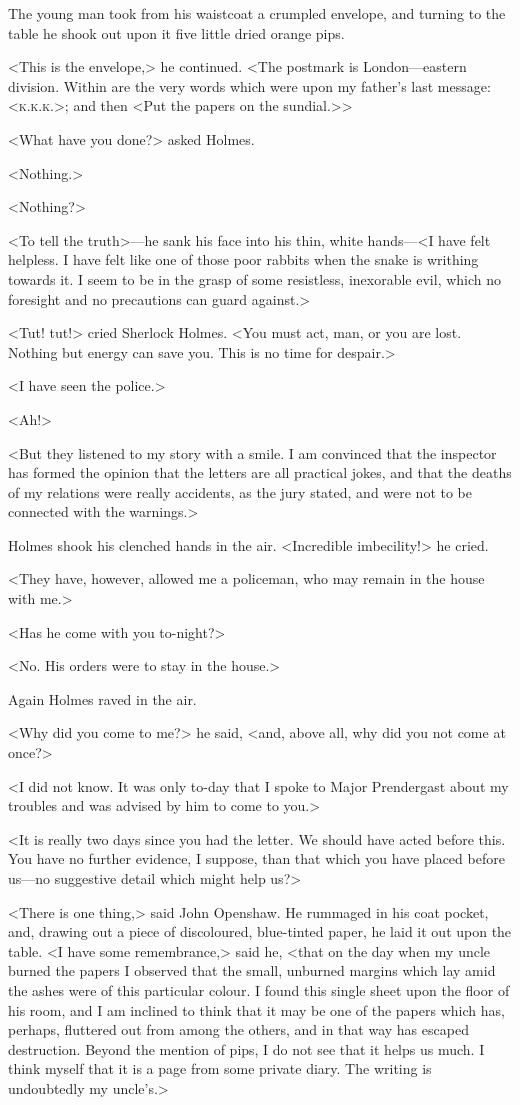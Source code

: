 The young man took from his waistcoat a crumpled envelope, and turning to the table he shook out upon it five little dried orange pips.

<This is the envelope,> he continued. <The postmark is London—eastern division. Within are the very words which were upon my father's last message: <\textsc{k.k.k.}>; and then <Put the papers on the sundial.>>

<What have you done?> asked Holmes.

<Nothing.>

<Nothing?>

<To tell the truth>—he sank his face into his thin, white hands—<I have felt helpless. I have felt like one of those poor rabbits when the snake is writhing towards it. I seem to be in the grasp of some resistless, inexorable evil, which no foresight and no precautions can guard against.>

<Tut! tut!> cried Sherlock Holmes. <You must act, man, or you are lost. Nothing but energy can save you. This is no time for despair.>

<I have seen the police.>

<Ah!>

<But they listened to my story with a smile. I am convinced that the inspector has formed the opinion that the letters are all practical jokes, and that the deaths of my relations were really accidents, as the jury stated, and were not to be connected with the warnings.>

Holmes shook his clenched hands in the air. <Incredible imbecility!> he cried.

<They have, however, allowed me a policeman, who may remain in the house with me.>

<Has he come with you to-night?>

<No. His orders were to stay in the house.>

Again Holmes raved in the air.

<Why did you come to me?> he said, <and, above all, why did you not come at once?>

<I did not know. It was only to-day that I spoke to Major Prendergast about my troubles and was advised by him to come to you.>

<It is really two days since you had the letter. We should have acted before this. You have no further evidence, I suppose, than that which you have placed before us—no suggestive detail which might help us?>

<There is one thing,> said John Openshaw. He rummaged in his coat pocket, and, drawing out a piece of discoloured, blue-tinted paper, he laid it out upon the table. <I have some remembrance,> said he, <that on the day when my uncle burned the papers I observed that the small, unburned margins which lay amid the ashes were of this particular colour. I found this single sheet upon the floor of his room, and I am inclined to think that it may be one of the papers which has, perhaps, fluttered out from among the others, and in that way has escaped destruction. Beyond the mention of pips, I do not see that it helps us much. I think myself that it is a page from some private diary. The writing is undoubtedly my uncle's.>

